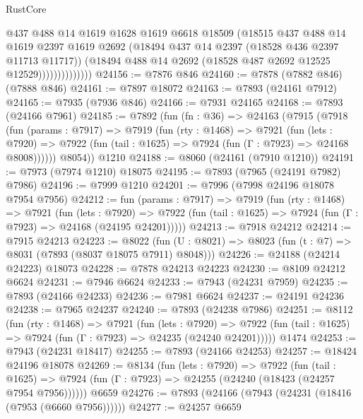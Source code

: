 \begin{lexlean}{RustCore}
\begin{coremodule}
                          @437
                          @488
                          @14
                          @1619
                          @1628
                          @1619
                          @6618
                          @18509
                          (@18515
                            @437
                            @488
                            @14
                            @1619
                            @2397
                            @1619
                            @2692
                            (@18494 @437 @14 @2397 (@18528 @436 @2397 @11713 @11717))
                            (@18494 @488 @14 @2692 (@18528 @487 @2692 @12525 @12529))))))))))))))
@24156 := @7876 @846
@24160 := @7878 (@7882 @846) (@7888 @846)
@24161 := @7897 @18072
@24163 := @7893 (@24161 @7912)
@24165 := @7935 (@7936 @846)
@24166 := @7931 @24165
@24168 := @7893 (@24166 @7961)
@24185 := @7892
    (fun (fn : @36) =>
    @24163
      (@7915
        (@7918
          (fun (params : @7917) =>
          @7919
            (fun (rty : @1468) =>
            @7921
              (fun (lets : @7920) =>
              @7922 (fun (tail : @1625) => @7924 (fun (Γ : @7923) => @24168 @8008))))))
        @8054))
    @1210
@24188 := @8060 (@24161 (@7910 @1210))
@24191 := @7973 (@7974 @1210) @18075
@24195 := @7893 (@7965 (@24191 @7982) @7986)
@24196 := @7999 @1210
@24201 := @7996 (@7998 @24196 @18078 @7954 @7956)
@24212 := fun (params : @7917) =>
  @7919
    (fun (rty : @1468) =>
    @7921
      (fun (lets : @7920) =>
      @7922 (fun (tail : @1625) => @7924 (fun (Γ : @7923) => @24168 (@24195 @24201)))))
@24213 := @7918 @24212
@24214 := @7915 @24213
@24223 := @8022
    (fun (U : @8021) => @8023 (fun (t : @7) => @8031 (@7893 (@8037 @18075 @7911) @8048)))
@24226 := @24188 (@24214 @24223) @18073
@24228 := @7878 @24213 @24223
@24230 := @8109 @24212 @6624
@24231 := @7946 @6624
@24233 := @7943 (@24231 @7959)
@24235 := @7893 (@24166 @24233)
@24236 := @7981 @6624
@24237 := @24191 @24236
@24238 := @7965 @24237
@24240 := @7893 (@24238 @7986)
@24251 := @8112
    (fun (rty : @1468) =>
    @7921
      (fun (lets : @7920) =>
      @7922 (fun (tail : @1625) => @7924 (fun (Γ : @7923) => @24235 (@24240 @24201)))))
    @1474
@24253 := @7943 (@24231 @18417)
@24255 := @7893 (@24166 @24253)
@24257 := @18424 @24196 @18078
@24269 := @8134
    (fun (lets : @7920) =>
    @7922
      (fun (tail : @1625) =>
      @7924 (fun (Γ : @7923) => @24255 (@24240 (@18423 (@24257 @7954 @7956))))))
    @6659
@24276 := @7893 (@24166 (@7943 (@24231 (@18416 (@7953 (@6660 @7956))))))
@24277 := @24257 @6659

\end{coremodule}
\end{lexlean}
